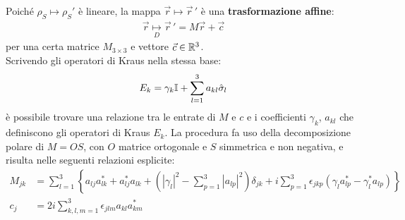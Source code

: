\documentclass[../../InformazioneQuantistica.tex]{subfiles}
\begin{document}
Poiché $\rho_S \mapsto \rho_S'$ è lineare, la mappa $\vec{r} \mapsto \vec{r}\,'$ è una \textbf{trasformazione affine}:
\begin{align}
\vec{r} \underset{D}{\mapsto} \vec{r}\,' = M\vec{r} + \vec{c}
\label{eqn:decoerenza-affine}
\end{align}
per una certa matrice $M_{3\times 3}$ e vettore $\vec{c} \in \mathbb{R}^3$.\\

Scrivendo gli operatori di Kraus nella stessa base:
\begin{align*}
E_k = \gamma_k \mathbb{I} + \sum_{l=1}^3 a_{kl}\hat{\sigma}_l
\end{align*}
è possibile trovare una relazione tra le entrate di $M$ e $c$ e i coefficienti $\gamma_k$, $a_{kl}$ che definiscono gli operatori di Kraus $E_k$. La procedura fa uso della decomposizione polare di $M = OS$, con $O$ matrice ortogonale e $S$ simmetrica e non negativa, e risulta nelle seguenti relazioni esplicite:
\begin{align*}
M_{jk} &= \sum_{l=1}^3 \left\{ a_{lj}a_{lk}^* + a_{lj}^*a_{lk} + \left(|\gamma_l|^2 - \sum_{p=1}^3 |a_{lp}|^2 \right)\delta_{jk} + i\sum_{p=1}^3 \epsilon_{jkp}(\gamma_l a^*_{lp}-\gamma^*_l a_{lp})\right\}\\
c_{j} &= 2i \sum_{k,l,m=1}^3 \epsilon_{jlm}a_{kl}a_{km}^*
\end{align*}
\end{document}
